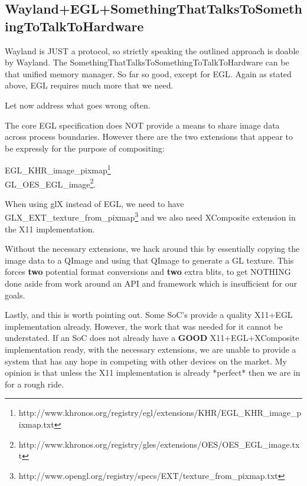 \documentclass[a4paper,11pt]{article}
\begin{document}
\subsection{Wayland+EGL+SomethingThatTalksToSomethingToTalkToHardware}
\begin{indenter}{2cm}

Wayland is JUST a protocol, so strictly speaking the outlined
approach is doable by Wayland. The
SomethingThatTalksToSomethingToTalkToHardware can be that unified memory
manager. So far so good, except for EGL. Again as stated above,
EGL requires much more that we need.

Let now address what goes wrong often.

The core EGL specification does NOT provide a means to share
image data across process boundaries. However there are the two
extensions that appear to be expressly for the purpose of compositing: 

\begin{indenter}{4cm}
EGL\_KHR\_image\_pixmap\footnote{http://www.khronos.org/registry/egl/extensions/KHR/EGL\_KHR\_image\_pixmap.txt} \\
GL\_OES\_EGL\_image\footnote{http://www.khronos.org/registry/gles/extensions/OES/OES\_EGL\_image.txt}. \\
\end{indenter}

When using glX instead of EGL, we need to have GLX\_EXT\_texture\_from\_pixmap\footnote{http://www.opengl.org/registry/specs/EXT/texture\_from\_pixmap.txt} and
we also need XComposite extension in the X11 implementation.

Without the necessary extensions, we hack around this by essentially
copying the image data to a QImage and using that QImage to generate
a GL texture. This forces \textbf{two} potential format conversions and
\textbf{two} extra blits, to get NOTHING done aside from work around an API
and framework which is insufficient for our goals.


Lastly, and this is worth pointing out. Some SoC's provide a quality
X11+EGL implementation already. However, the work that was needed
for it cannot be understated. If an SoC does not already have a
\textbf{GOOD} X11+EGL+XComposite implementation ready, with the necessary
extensions, we are unable to provide a system that has any hope in
competing with other devices on the market. My opinion is that unless
the X11 implementation is already *perfect* then we are in for a
rough ride.

\end{indenter}
\end{document}
